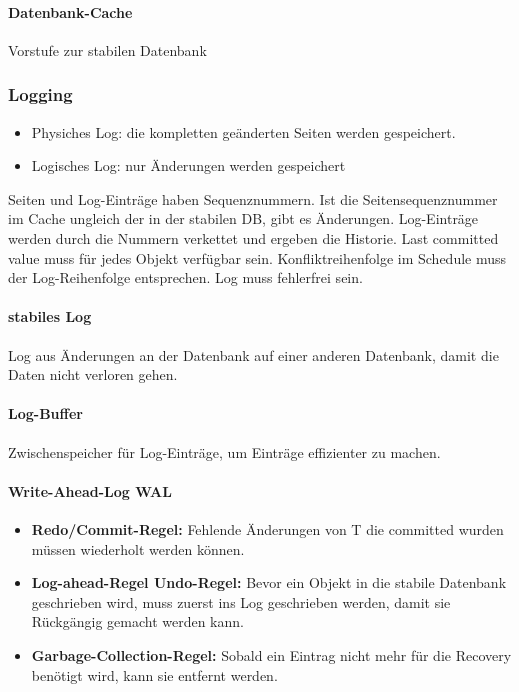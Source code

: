 \documentclass[ngerman]{scrartcl}
\begin{document}
\paragraph{Datenbank-Cache} Vorstufe zur stabilen Datenbank


\subsubsection*{Logging}

\begin{itemize}
  \item Physiches Log: die kompletten geänderten Seiten werden gespeichert.
  \item Logisches Log: nur Änderungen werden gespeichert
\end{itemize}
Seiten und Log-Einträge haben Sequenznummern. Ist die Seitensequenznummer im Cache ungleich der in der stabilen DB, gibt es Änderungen. Log-Einträge werden durch die Nummern verkettet und ergeben die Historie. 
Last committed value muss für jedes Objekt verfügbar sein. Konfliktreihenfolge im Schedule muss der Log-Reihenfolge entsprechen. Log muss fehlerfrei sein.

\paragraph{stabiles Log} Log aus Änderungen an der Datenbank auf einer anderen Datenbank, damit die Daten nicht verloren gehen. 

\paragraph{Log-Buffer} Zwischenspeicher für Log-Einträge, um Einträge effizienter zu machen.

\paragraph{Write-Ahead-Log WAL} 
\begin{itemize}
  \item \textbf{Redo/Commit-Regel:} Fehlende Änderungen von T die committed wurden müssen wiederholt werden können. 
  \item \textbf{Log-ahead-Regel Undo-Regel:} Bevor ein Objekt in die stabile Datenbank geschrieben wird, muss zuerst ins Log geschrieben werden, damit sie Rückgängig gemacht werden kann.
  \item \textbf{Garbage-Collection-Regel:} Sobald ein Eintrag nicht mehr für die Recovery benötigt wird, kann sie entfernt werden.
\end{itemize}
\end{document}

